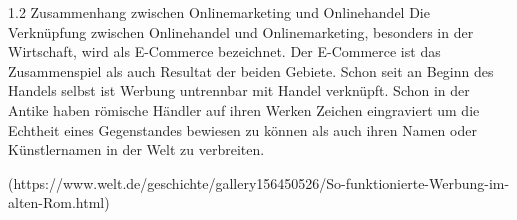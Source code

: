 1.2 Zusammenhang zwischen Onlinemarketing und Onlinehandel
Die Verknüpfung zwischen Onlinehandel und Onlinemarketing, besonders in der Wirtschaft, wird als E-Commerce bezeichnet. Der E-Commerce ist das Zusammenspiel als auch Resultat der beiden Gebiete. Schon seit an Beginn des Handels selbst ist Werbung untrennbar mit Handel verknüpft. Schon in der Antike haben römische Händler auf ihren Werken Zeichen eingraviert um die Echtheit eines Gegenstandes bewiesen zu können als auch ihren Namen oder Künstlernamen in der Welt zu verbreiten.
     
(https://www.welt.de/geschichte/gallery156450526/So-funktionierte-Werbung-im-alten-Rom.html)
